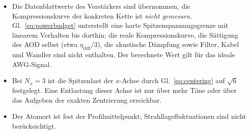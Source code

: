 \documentclass[11pt,a4paper]{article}
\begin{document}
\begin{itemize}\itemsep0.2em
  \item Die Datenblattwerte des Verstärkers sind übernommen, die
        Kompressionskurve der konkreten Kette ist \emph{nicht gemessen}.
        Gl.~\eqref{eq:powerbudget} unterstellt eine harte Spitzenspannungs\-grenze
        mit linearem Verhalten bis dorthin; die reale Kompressionskurve,
        die Sättigung des AOD selbst (etwa $\eta_\mathrm{diff}/3$), die
        akustische Dämpfung sowie Filter, Kabel und Wandler sind nicht
        enthalten. Der berechnete Wert gilt für das ideale AWG-Signal.
  \item Bei $N_x=3$ ist die Spitzenlast der $x$-Achse durch
        Gl.~\eqref{eq:centering} auf $\sqrt{6}$ festgelegt. Eine Entlastung
        dieser Achse ist nur über mehr Töne oder über das Aufgeben der
        exakten Zentrierung erreichbar.
  \item Der Atomort ist fest der Profilmittelpunkt; Strahllagefluktuationen
        sind nicht berücksichtigt.
\end{itemize}
\end{document}
